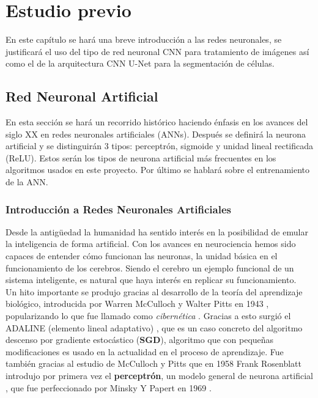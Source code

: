 \chapter{Estudio previo}\label{analanteced}

En este capítulo se hará una breve introducción a las redes neuronales, se justificará el uso del tipo de red neuronal CNN para tratamiento de imágenes así como el de la arquitectura CNN U-Net para la segmentación de células.

\section{Red Neuronal Artificial}\label{sec:redneuronal}

En esta sección se hará un recorrido histórico haciendo énfasis en los avances del siglo XX en redes neuronales artificiales (ANNs). Después se definirá la neurona artificial y se distinguirán 3 tipos: perceptrón, sigmoide y unidad lineal rectificada (ReLU). Estos serán los tipos de neurona artificial más frecuentes en los algoritmos usados en este proyecto. Por último se hablará sobre el entrenamiento de la ANN.

\subsection{Introducción a Redes Neuronales Artificiales}\label{subsec:nn_intro}

Desde la antigüedad la humanidad ha sentido interés en la posibilidad de emular la inteligencia de forma artificial. Con los avances en neurociencia hemos sido capaces de entender cómo funcionan las neuronas, la unidad básica en el funcionamiento de los cerebros. Siendo el cerebro un ejemplo funcional de un sistema inteligente, es natural  que haya interés en replicar su funcionamiento.\\

Un hito importante se produjo gracias al desarrollo de la teoría del aprendizaje biológico, introducida por Warren McCulloch y Walter Pitts en 1943 \cite{McCulloch1943}, popularizando lo que fue llamado como \emph{cibernética} \cite[p13]{Goodfellow2016}. Gracias a esto surgió el ADALINE (elemento lineal adaptativo) \cite{Widrow2015}, que es un caso concreto del algoritmo descenso por gradiente estocástico (\textbf{SGD}), algoritmo que con pequeñas modificaciones es usado en la actualidad en el proceso de aprendizaje\cite[p14]{Goodfellow2016}. Fue también gracias al estudio de McCulloch y Pitts que en 1958 Frank Rosenblatt introdujo por primera vez el \textbf{perceptrón}, un modelo general de neurona artificial \cite{Rosenblatt1958}, que fue perfeccionado por Minsky Y Papert en 1969 \cite{Minsky1969}.

